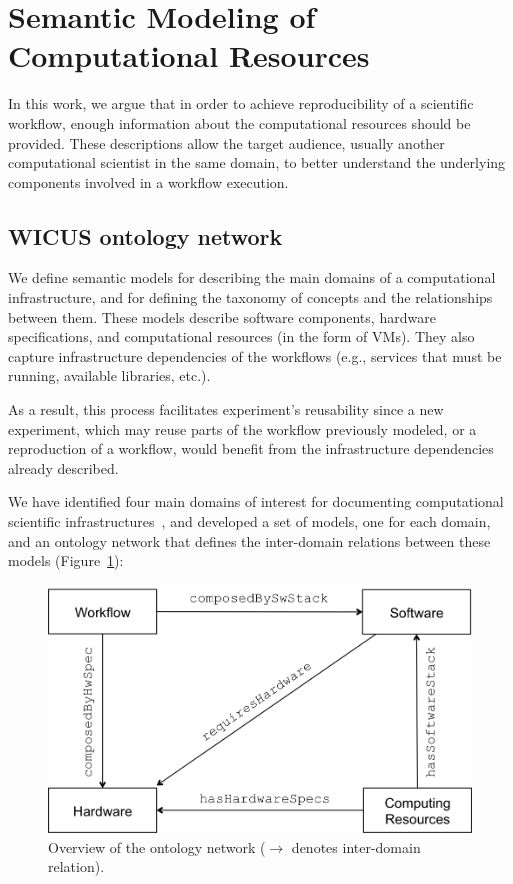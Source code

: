 \section{Semantic Modeling of Computational Resources}
\label{sec:semantic}

In this work, we argue that in order to achieve reproducibility of a scientific workflow, enough information 
about the computational resources should be provided. These descriptions allow the target audience, 
usually another computational scientist in the same domain, to better understand the underlying 
components involved in a workflow execution.


\subsection{WICUS ontology network}

We define semantic models for describing the main domains of a 
computational infrastructure, and for defining the taxonomy of concepts and the relationships 
between them. These models describe software components, hardware specifications, 
and computational resources (in the form of VMs). They also capture infrastructure 
dependencies of the workflows (e.g., services that must be running, available libraries, etc.).
 
 As a result, this process facilitates experiment's reusability since 
a new experiment, which may reuse parts of the workflow previously modeled, or a reproduction 
of a workflow, would benefit from the infrastructure dependencies already described.

We have identified four main domains of interest for documenting computational scientific 
infrastructures~\cite{wicus}, and developed a set of models, one for each domain, 
and an ontology network that defines the inter-domain relations between these models 
(Figure~\ref{fig:wicusrels}):

\begin{figure}[!t]
	\centering
	\includegraphics[width=.9\linewidth]{figures/wicusrels}
	\caption{Overview of the ontology network ($\rightarrow$ denotes inter-domain relation).}
	\label{fig:wicusrels}
\end{figure}

